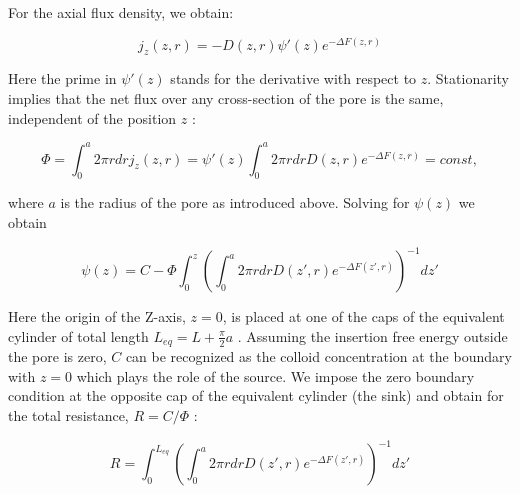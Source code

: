 For the axial flux density, we obtain:

\begin{equation}
j_{z}(z,r)=-D(z,r)\psi'(z)e^{-\Delta F(z,r)}\label{eq:flux_ansatz}
\end{equation}

\noindent Here the prime in  $\psi'(z)$ stands for the derivative with respect to $z$. Stationarity implies that the net flux over any cross-section of the pore is the same, independent of the position  $z$ :

\begin{equation}
\Phi=\int_{0}^{a}2\pi rdrj_{z}(z,r)=\psi'(z)\int_{0}^{a}2\pi rdrD(z,r)e^{-\Delta F(z,r)}=const,\label{eq:fi_const}
\end{equation}

\noindent where $a$ is the radius of the pore as introduced above. Solving for $\psi(z)$  we obtain 

\begin{equation}
\psi(z)=C-\Phi\int_{0}^{z}\left(\int_{0}^{a}2\pi rdrD(z',r)e^{-\Delta F(z',r)}\right)^{-1}dz'\label{eq:psi}
\end{equation}

\noindent Here the origin of the Z-axis,  $z=0$, is placed at one of the caps of the equivalent cylinder  of total length $L_{eq}= L+\frac{\pi}{2}a$  . Assuming the insertion free energy outside the pore is zero, $ C$  can be recognized as the colloid concentration at the boundary with $z=0$ which plays the role of the source.   We impose the zero boundary condition at the opposite cap of the equivalent cylinder (the sink) and obtain for the total resistance, $R=C/\Phi$ : 

\begin{equation}
R=\int_{0}^{L_{eq}}\left(\int_{0}^{a}2\pi rdrD(z',r)e^{-\Delta F(z',r)}\right)^{-1}dz'\label{eq:res_with_brush}
\end{equation}

